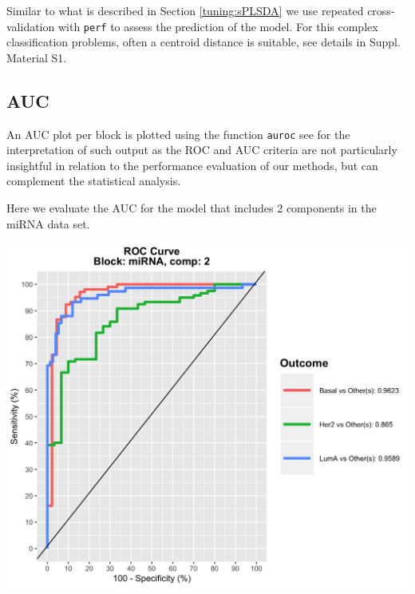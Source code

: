\documentclass[]{book}
\newenvironment{Shaded}{\begin{snugshade}}{\end{snugshade}}
\newcommand{\KeywordTok}[1]{\textcolor[rgb]{0.13,0.29,0.53}{\textbf{#1}}}
\newcommand{\DataTypeTok}[1]{\textcolor[rgb]{0.13,0.29,0.53}{#1}}
\newcommand{\DecValTok}[1]{\textcolor[rgb]{0.00,0.00,0.81}{#1}}
\newcommand{\StringTok}[1]{\textcolor[rgb]{0.31,0.60,0.02}{#1}}
\newcommand{\CommentTok}[1]{\textcolor[rgb]{0.56,0.35,0.01}{\textit{#1}}}
\newcommand{\NormalTok}[1]{#1}
\theoremstyle{definition}
\theoremstyle{definition}
\theoremstyle{definition}
\theoremstyle{remark}
\begin{document}
Similar to what is described in Section \ref{tuning:sPLSDA} we use
repeated cross-validation with \texttt{perf} to assess the prediction of
the model. For this complex classification problems, often a centroid
distance is suitable, see details in \citep{mixomics} Suppl. Material
S1.

\begin{Shaded}
\end{Shaded}

\subsection{AUC}\label{auc}

An AUC plot per block is plotted using the function \texttt{auroc} see
\citep{mixomics}for the interpretation of such output as the ROC and AUC
criteria are not particularly insightful in relation to the performance
evaluation of our methods, but can complement the statistical analysis.

Here we evaluate the AUC for the model that includes 2 components in the
miRNA data set.

\begin{center}\includegraphics[width=0.5\linewidth]{Figures/unnamed-chunk-12-1} \end{center}
\end{document}
